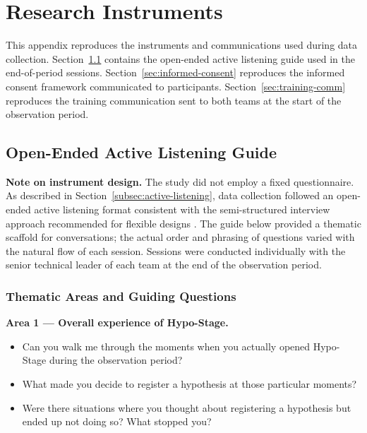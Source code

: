 
\chapter{Research Instruments}
\label{apx:instruments}

This appendix reproduces the instruments and communications used during data
collection. Section~\ref{sec:listening-guide} contains the open-ended active
listening guide used in the end-of-period sessions.
Section~\ref{sec:informed-consent} reproduces the informed consent framework
communicated to participants. Section~\ref{sec:training-comm} reproduces the
training communication sent to both teams at the start of the observation period.

\section{Open-Ended Active Listening Guide}
\label{sec:listening-guide}

\textbf{Note on instrument design.} The study did not employ a fixed
questionnaire. As described in Section~\ref{subsec:active-listening}, data collection followed an
open-ended active listening format consistent with the semi-structured
interview approach recommended for flexible designs \citep{robson2016}.
The guide below provided a thematic scaffold for conversations; the actual
order and phrasing of questions varied with the natural flow of each session.
Sessions were conducted individually with the senior technical leader of each
team at the end of the observation period.

\subsection*{Thematic Areas and Guiding Questions}

\textbf{Area 1 --- Overall experience of Hypo-Stage.}
\begin{itemize}
  \item Can you walk me through the moments when you actually opened Hypo-Stage
    during the observation period?
  \item What made you decide to register a hypothesis at those particular
    moments?
  \item Were there situations where you thought about registering a hypothesis
    but ended up not doing so? What stopped you?
\end{itemize}

